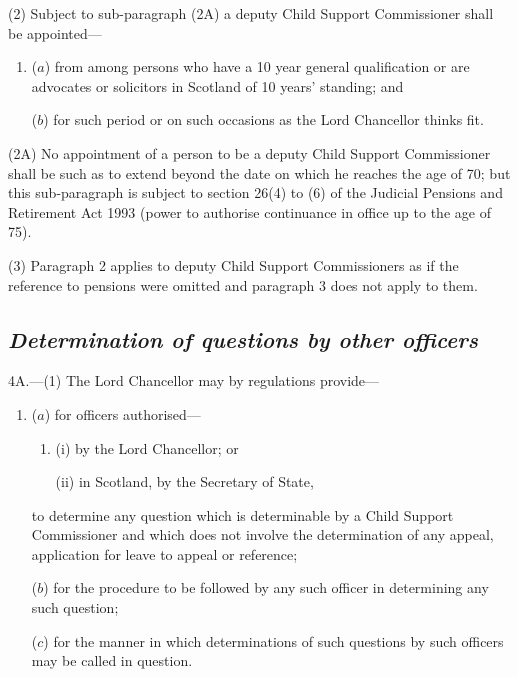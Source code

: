 \documentclass[12pt,a4paper]{article}
\begin{document}
(2) 
Subject to sub-paragraph (2A)  %
a deputy Child Support Commissioner shall be appointed—
\begin{enumerate}\item[]
($a$) from among persons who have a 10 year general qualification or are advocates or solicitors in Scotland of 10 years' standing; and

($b$) for such period or on such occasions as the Lord Chancellor thinks fit.
\end{enumerate}

(2A) No appointment of a person to be a deputy Child Support Commissioner shall be such as to extend beyond the date on which he reaches the age of 70; but this sub-paragraph is subject to section 26(4) to (6) of the Judicial Pensions and Retirement Act 1993 (power to authorise continuance in office up to the age of 75).

(3) Paragraph 2 applies to deputy Child Support Commissioners as if the reference to pensions were omitted and paragraph 3 does not apply to them.


\subsection*{\itshape Determination of questions by other officers}

4A.---(1) The Lord Chancellor may by regulations provide—
\begin{enumerate}\item[]
($a$) for officers authorised—
\begin{enumerate}\item[]
(i) by the Lord Chancellor; or

(ii) in Scotland, by the Secretary of State,
\end{enumerate}
to determine any question which is determinable by a Child Support Commissioner and which does not involve the determination of any appeal, application for leave to appeal or reference;

($b$) for the procedure to be followed by any such officer in determining any such question;

($c$) for the manner in which determinations of such questions by such officers may be called in question.
\end{enumerate}
\end{document}
